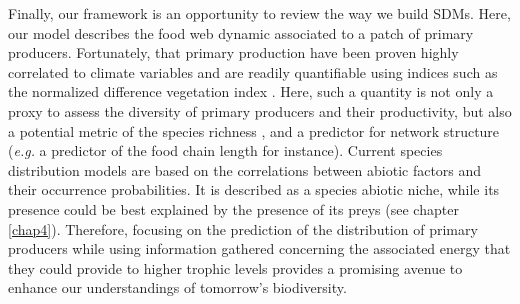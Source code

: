 Finally, our framework is an opportunity to review the way we build
SDMs. Here, our model describes the food web dynamic associated to a
patch of primary producers. Fortunately, that primary production have
been proven highly correlated to climate variables
\citep{Wright1983, Hawkins2003, Evans2005} and are readily quantifiable
using indices such as the normalized difference vegetation index
\citep[NDVI][]{Evans2005}. Here, such a quantity is not only a proxy to
assess the diversity of primary producers and their productivity, but
also a potential metric of the species richness \citep{Wright1983}, and
a predictor for network structure (\emph{e.g.} a predictor of the food
chain length for instance). Current species distribution models are
based on the correlations between abiotic factors and their occurrence
probabilities. It is described as a species abiotic niche, while its
presence could be best explained by the presence of its preys (see
chapter \ref{chap4}). Therefore, focusing on the prediction of the
distribution of primary producers while using information gathered
concerning the associated energy that they could provide to higher
trophic levels provides a promising avenue to enhance our understandings
of tomorrow's biodiversity.
